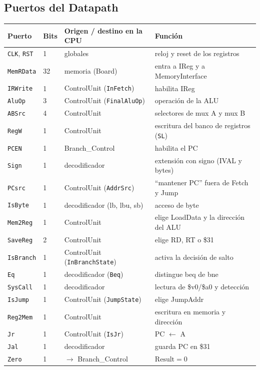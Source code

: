\documentclass[11pt,a4paper]{article}
\newcommand{\sig}[1]{\texttt{#1}}
\begin{document}
\subsection{Puertos del Datapath}
\begin{table}[H]
\centering
\scriptsize
\begin{tabular}{p{1.9cm}p{0.7cm}p{5.4cm}p{6.6cm}}
\toprule
Puerto & Bits & Origen / destino en la CPU & Funci\'on\\
\midrule
\sig{CLK}, \sig{RST} & 1 & globales & reloj y reset de los registros\\
\sig{MemRData} & 32 & memoria (Board) & entra a IReg y a MemoryInterface\\
\sig{IRWrite} & 1 & ControlUnit (\sig{InFetch}) & habilita IReg\\
\sig{AluOp} & 3 & ControlUnit (\sig{FinalAluOp}) & operaci\'on de la ALU\\
\sig{ABSrc} & 4 & ControlUnit & selectores de mux A y mux B\\
\sig{RegW} & 1 & ControlUnit & escritura del banco de registros (\sig{SL})\\
\sig{PCEN} & 1 & Branch\_Control & habilita el PC\\
\sig{Sign} & 1 & decodificador & extensi\'on con signo (IVAL y bytes)\\
\sig{PCsrc} & 1 & ControlUnit (\sig{AddrSrc}) & ``mantener PC'' fuera de Fetch y Jump\\
\sig{IsByte} & 1 & decodificador (lb, lbu, sb) & acceso de byte\\
\sig{Mem2Reg} & 1 & ControlUnit & elige LoadData y la direcci\'on del ALU\\
\sig{SaveReg} & 2 & ControlUnit & elige RD, RT o \$31\\
\sig{IsBranch} & 1 & ControlUnit (\sig{InBranchState}) & activa la decisi\'on de salto\\
\sig{Eq} & 1 & decodificador (\sig{Beq}) & distingue beq de bne\\
\sig{SysCall} & 1 & decodificador & lectura de \$v0/\$a0 y detecci\'on\\
\sig{IsJump} & 1 & ControlUnit (\sig{JumpState}) & elige JumpAddr\\
\sig{Reg2Mem} & 1 & ControlUnit & escritura en memoria y direcci\'on\\
\sig{Jr} & 1 & ControlUnit (\sig{IsJr}) & PC $\leftarrow$ A\\
\sig{Jal} & 1 & decodificador & guarda PC en \$31\\
\midrule
\sig{Zero} & 1 & $\to$ Branch\_Control & $\mathrm{Result}=0$\\

\end{tabular}
\end{table}
\end{document}

